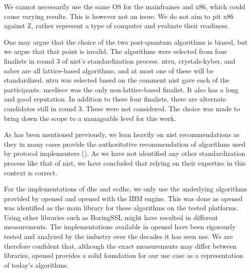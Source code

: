 We cannot necessarily use the same OS for the mainframes and x86, which could cause varying results. This is however not an issue. We do not aim to pit x86 against Z, rather represent a type of computer and evaluate their readiness.

One may argue that the choice of the two post-quantum algorithms is biased, but we argue that that point is invalid. The algorithms were selected from four finalists in round 3 of \gls{nist}'s standardization process. \gls{ntru}, \gls{crystals-kyber}, and \gls{saber} are all lattice-based algorithms, and at most one of these will be standardized. \gls{ntru} was selected based on the comment \gls{nist} gave each of the participants. \gls{mceliece} was the only non-lattice-based finalist. It also has a long and good reputation\cite{nist2020}. In addition to these four finalists, there are alternate candidates still in round 3. These were not considered. The choice was made to bring down the scope to a manageable level for this work.

As has been mentioned previously, we lean heavily on \gls{nist} recommendations as they in many cases provide the authoritative recommendation of algorithms used by protocol implementers (). As we have not identified any other standardization process like that of \gls{nist}, we have concluded that relying on their expertise in this context is correct.

For the implementations of \gls{dhe} and \gls{ecdhe}, we only use the underlying algorithms provided by \gls{openssl} and \gls{openssl} with the IBM engine. This was done as \gls{openssl} was identified as the main library for these algorithms on the tested platforms. Using other libraries such as BoringSSL might have resulted in different measurements. The implementations available in \gls{openssl} have been rigorously tested and analyzed by the industry over the decades it has seen use. We are therefore confident that, although the exact measurements may differ between libraries, \gls{openssl} provides a solid foundation for our use case as a representation of today's algorithms.



